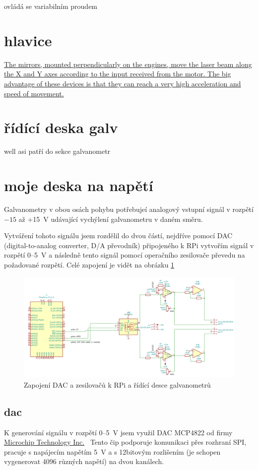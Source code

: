 \documentclass{template/socthesis}
\begin{document}
ovládá se variabilním proudem

\section{hlavice}
\href{https://elenlaser.com/blog/galvo-head-laser-focus-tool.html}{The mirrors, mounted perpendicularly on the engines, move the laser beam along the X and Y axes according to the input received from the motor.
  The big advantage of these devices is that they can reach a very high acceleration and speed of movement.}
\section{řídící deska galv}
well asi patří do sekce galvanometr

\section{moje deska na napětí}
Galvanometry v obou osách pohybu potřebujeí analogový vstupní signál v rozpětí $-15$ až +15~V udávající vychýlení galvanometru v daném směru.

Vytváření tohoto signálu jsem rozdělil do dvou částí, nejdříve pomocí DAC (digital-to-analog converter, D/A převodník) připojeného k RPi vytvořím signál v rozpětí 0--5~V a následně tento signál pomocí operačního zesilovače převedu na požadované rozpětí.
Celé zapojení je vidět na obrázku \ref{fig:dac_board}
\begin{figure}[!htb]
  \centering
  \includegraphics[width=1\textwidth]{img/dac_board.png} %
  \caption{\label{fig:dac_board}Zapojení DAC a zesilovačů k RPi a řídící desce galvanometrů}
\end{figure}

\subsection{dac}
K generování signálu v rozpětí 0--5~V jsem využil DAC MCP4822 od firmy \href{https://www.microchip.com}{Microchip Technology Inc.}\ %
Tento čip podporuje komunikaci přes rozhraní SPI, pracuje s napájecím napětím 5~V a s 12bitovým rozlišením (je schopen vygenerovat 4096 různých napětí) na dvou kanálech.
\end{document}
